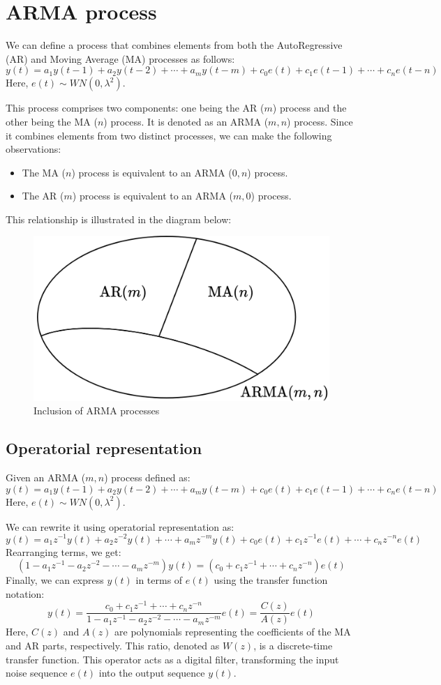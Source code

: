 \section{ARMA process}

We can define a process that combines elements from both the AutoRegressive (AR) and Moving Average (MA) processes as follows:
\[y(t)=a_1y(t-1)+a_2y(t-2)+\cdots+a_m y(t-m)+c_0e(t)+c_1e(t-1)+\cdots+c_n e(t-n) \]
Here, $e(t)\sim WN(0,\lambda^2)$.

This process comprises two components: one being the AR ($m$) process and the other being the MA ($n$) process. 
It is denoted as an ARMA ($m,n$) process.
Since it combines elements from two distinct processes, we can make the following observations:
\begin{itemize}
    \item The MA ($n$) process is equivalent to an ARMA ($0,n$) process.
    \item The AR ($m$) process is equivalent to an ARMA ($m,0$) process. 
\end{itemize}
This relationship is illustrated in the diagram below:
\begin{figure}[H]
    \centering
    \includegraphics[width=0.45\linewidth]{images/set.png}
    \caption{Inclusion of ARMA processes}
\end{figure}

\subsection{Operatorial representation}
Given an ARMA ($m,n$) process defined as:
\[y(t)=a_1y(t-1)+a_2y(t-2)+\cdots+a_m y(t-m)+c_0e(t)+c_1e(t-1)+\cdots+c_n e(t-n)\]
Here, $e(t)\sim WN(0,\lambda^2)$.

We can rewrite it using operatorial representation as:
\[y(t)=a_1z^{-1}y(t)+a_2z^{-2}y(t)+\cdots+a_m z^{-m}y(t)+c_0e(t)+c_1z^{-1}e(t)+\cdots+c_n z^{-n}e(t)\]
Rearranging terms, we get:
\[\left(1- a_1z^{-1}-a_2z^{-2}-\cdots-a_m z^{-m}\right)y(t)=\left(c_0+c_1z^{-1}+\cdots+c_n z^{-n}\right)e(t)\]
Finally, we can express $y(t)$ in terms of $e(t)$ using the transfer function notation:
\[y(t)=\dfrac{c_0+c_1z^{-1}+\cdots+c_n z^{-n}}{1- a_1z^{-1}-a_2z^{-2}-\cdots-a_m z^{-m}}e(t)=\dfrac{C(z)}{A(z)}e(t)\]
Here, $C(z)$ and $A(z)$ are polynomials representing the coefficients of the MA and AR parts, respectively. 
This ratio, denoted as $W(z)$, is a discrete-time transfer function. 
This operator acts as a digital filter, transforming the input noise sequence $e(t)$ into the output sequence $y(t)$.

